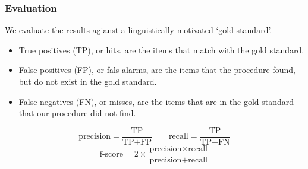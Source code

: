 \begin{frame}
\frametitle{Evaluation}
We evaluate the results agianst a linguistically motivated `gold
standard'.

\begin{itemize}
\item True positives (TP), or hits, are the items that match with the
gold standard.
\item False positives (FP), or fals alarms, are the items that the
procedure found, but do not exist in the gold standard.
\item False negatives (FN), or misses, are the items that are in the
gold standard that our procedure did not find.
\end{itemize}

\begin{equation*}
\text{precision}=\frac{\textrm{TP}}{\textrm{TP} + \textrm{FP}}\quad\quad
\text{recall}=\frac{\textrm{TP}}{\textrm{TP} + \textrm{FN}}
\end{equation*}%
\begin{equation*}
\text{f-score} =2\times\frac{\text{precision}\times\text{recall}}{\text{precision}+\text{recall}}
\end{equation*}

\end{frame}
